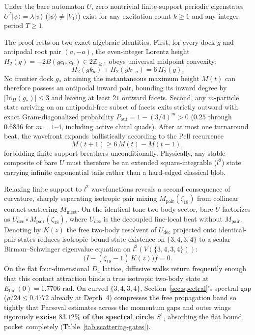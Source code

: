 \begin{theorem}
\label{thm:compacton-nogo}
Under the bare automaton $U$, zero nontrivial finite-support periodic eigenstates $U^T |\psi\rangle = \lambda
|\psi\rangle$ ($|\psi\rangle \neq |V_1\rangle$) exist for any excitation count $k \ge 1$ and any integer period
$T \ge 1$.
\end{theorem}

The proof rests on two exact algebraic identities. First, for every dock $g$ and antipodal root pair $(a, -a)$, the
even-integer Lorentz height $H_2(g) = -2 B(g c_0, c_0) \in 2\mathbb{Z}_{\ge 1}$ obeys universal midpoint convexity:
\begin{equation}
H_2(g k_a) + H_2(g k_{-a}) = 6\, H_2(g).
\label{eq:height-convexity}
\end{equation}
No frontier dock $g_*$ attaining the instantaneous maximum height $M(t)$ can therefore possess an antipodal inward pair,
bounding its inward degree by $|\mathrm{In}_H(g_*)| \le 3$ and leaving at least $21$ outward facets. Second, any
$m$-particle state arriving on an antipodal-free subset of facets exits strictly outward with exact Gram-diagonalized
probability $P_{\mathrm{out}} = 1 - (3/4)^m > 0$ ($0.25$ through $0.6836$ for $m = 1\text{--}4$, including active chiral
quads). After at most one turnaround beat, the wavefront expands ballistically according to the Pell recurrence
\begin{equation}
M(t + 1) \ge 6\, M(t) - M(t - 1),
\label{eq:pell-frontier}
\end{equation}
forbidding finite-support breathers unconditionally. Physically, any stable composite of bare $U$ must therefore be an
extended square-integrable ($l^2$) state carrying infinite exponential tails rather than a hard-edged classical blob.

Relaxing finite support to $l^2$ wavefunctions reveals a second consequence of curvature, sharply separating isotropic
pair mixing $M_{\mathrm{pair}}(\zeta_{18})$ from collinear contact scattering $M_{\mathrm{meet}}$. On the identical-tone
two-body sector, bare $U$ factorizes as $U_{\mathrm{dec}} \circ M_{\mathrm{pair}}(\zeta_{18})$, where $U_{\mathrm{dec}}$
is the decoupled line-local beat without $M_{\mathrm{pair}}$. Denoting by $K(z)$ the free two-body resolvent of
$U_{\mathrm{dec}}$ projected onto identical-pair states reduces isotropic bound-state existence on $\{3,4,3,4\}$ to a
scalar Birman--Schwinger eigenvalue equation on $l^2(V(\{3,4,3,4\}))$:
\begin{equation}
\bigl(I - (\zeta_{18} - 1)\, K(z)\bigr) f = 0.
\label{eq:birman-schwinger}
\end{equation}
On the flat four-dimensional $D_4$ lattice, diffusive walks return frequently enough that this contact attraction binds a
true isotropic two-body state at $E_{\mathrm{flat}}(0) = 1.7706\text{ rad}$. On curved $\{3,4,3,4\}$,
Section~\ref{sec:spectral}'s spectral gap ($\rho/24 \le 0.4772$ already at Depth~4) compresses the free propagation band
so tightly that Parseval estimates across the momentum gaps and outer wings rigorously \textbf{excise $83.12\%$ of the
spectral circle $S^1$}, absorbing the flat bound pocket completely (Table~\ref{tab:scattering-gates}).


